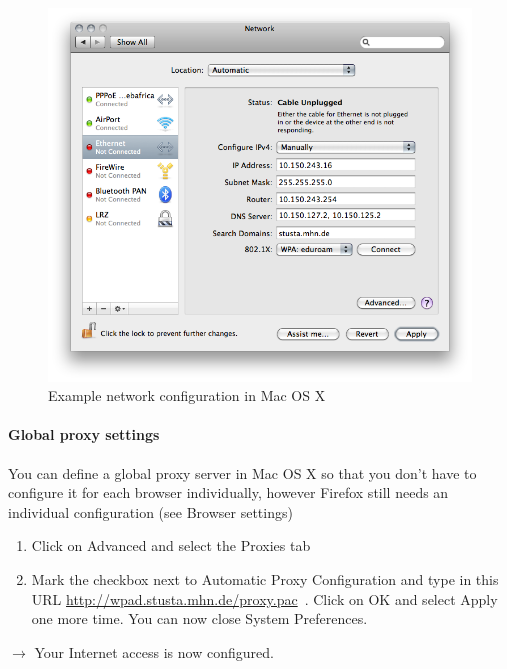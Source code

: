 \documentclass[a4paper,12pt]{scrartcl}
\begin{document}
\begin{enumerate}
\begin{figure}[h!]
\begin{minipage}[c]{0.38\linewidth}
        \end{minipage}
        \begin{minipage}[c]{0.60\linewidth}
          \centering
          \includegraphics[width=\linewidth,keepaspectratio]{Bilder/IP_Mac_EN}
          \caption{Example network configuration in Mac OS X}
        \end{minipage}
      \end{figure}
\end{enumerate}

\paragraph*{Global proxy settings}
You can define a global proxy server in Mac OS X so that you don't have to configure it for each browser individually, however Firefox still needs an individual configuration (see Browser settings)
\begin{enumerate}
    \item Click on Advanced and select the Proxies tab
    \item Mark the checkbox next to Automatic Proxy Configuration and type in this URL \url{http://wpad.stusta.mhn.de/proxy.pac}\ . Click on OK and select Apply one more time. You can now close System Preferences.
\end{enumerate}
$\rightarrow$ Your Internet access is now configured.
\end{document}
